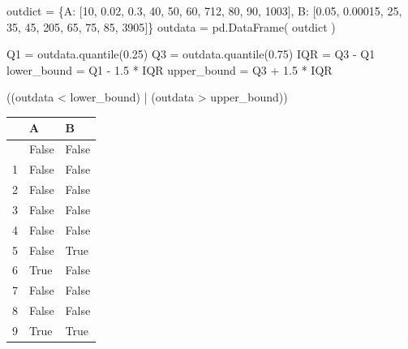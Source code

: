 \documentclass[
  a4paper,
  DIV=11,
  numbers=noendperiod]{scrreprt}
\newenvironment{Shaded}{\begin{snugshade}}{\end{snugshade}}
\newcommand{\DecValTok}[1]{\textcolor[rgb]{0.68,0.00,0.00}{#1}}
\newcommand{\FloatTok}[1]{\textcolor[rgb]{0.68,0.00,0.00}{#1}}
\newcommand{\NormalTok}[1]{\textcolor[rgb]{0.00,0.23,0.31}{#1}}
\newcommand{\OperatorTok}[1]{\textcolor[rgb]{0.37,0.37,0.37}{#1}}
\newcommand{\StringTok}[1]{\textcolor[rgb]{0.13,0.47,0.30}{#1}}
\begin{document}
\begin{Shaded}
\begin{Highlighting}[]
\NormalTok{outdict }\OperatorTok{=}\NormalTok{ \{}\StringTok{\textquotesingle{}A\textquotesingle{}}\NormalTok{: [}\DecValTok{10}\NormalTok{, }\FloatTok{0.02}\NormalTok{, }\FloatTok{0.3}\NormalTok{, }\DecValTok{40}\NormalTok{, }\DecValTok{50}\NormalTok{, }\DecValTok{60}\NormalTok{, }\DecValTok{712}\NormalTok{, }\DecValTok{80}\NormalTok{, }\DecValTok{90}\NormalTok{, }\DecValTok{1003}\NormalTok{],}
           \StringTok{\textquotesingle{}B\textquotesingle{}}\NormalTok{: [}\FloatTok{0.05}\NormalTok{, }\FloatTok{0.00015}\NormalTok{, }\DecValTok{25}\NormalTok{, }\DecValTok{35}\NormalTok{, }\DecValTok{45}\NormalTok{, }\DecValTok{205}\NormalTok{, }\DecValTok{65}\NormalTok{, }\DecValTok{75}\NormalTok{, }\DecValTok{85}\NormalTok{, }\DecValTok{3905}\NormalTok{]\}}
\NormalTok{outdata }\OperatorTok{=}\NormalTok{ pd.DataFrame( outdict )}

\NormalTok{Q1 }\OperatorTok{=}\NormalTok{ outdata.quantile(}\FloatTok{0.25}\NormalTok{)}
\NormalTok{Q3 }\OperatorTok{=}\NormalTok{ outdata.quantile(}\FloatTok{0.75}\NormalTok{)}
\NormalTok{IQR }\OperatorTok{=}\NormalTok{ Q3 }\OperatorTok{{-}}\NormalTok{ Q1}
\NormalTok{lower\_bound }\OperatorTok{=}\NormalTok{ Q1 }\OperatorTok{{-}} \FloatTok{1.5} \OperatorTok{*}\NormalTok{ IQR}
\NormalTok{upper\_bound }\OperatorTok{=}\NormalTok{ Q3 }\OperatorTok{+} \FloatTok{1.5} \OperatorTok{*}\NormalTok{ IQR}

\NormalTok{((outdata }\OperatorTok{\textless{}}\NormalTok{ lower\_bound) }\OperatorTok{|}\NormalTok{ (outdata }\OperatorTok{\textgreater{}}\NormalTok{ upper\_bound))}
\end{Highlighting}
\end{Shaded}

\begin{longtable}[]{@{}lll@{}}
\toprule\noalign{}
& A & B \\
\midrule\noalign{}
\endhead
\bottomrule\noalign{}
\endlastfoot
0 & False & False \\
1 & False & False \\
2 & False & False \\
3 & False & False \\
4 & False & False \\
5 & False & True \\
6 & True & False \\
7 & False & False \\
8 & False & False \\
9 & True & True \\
\end{longtable}
\end{document}
